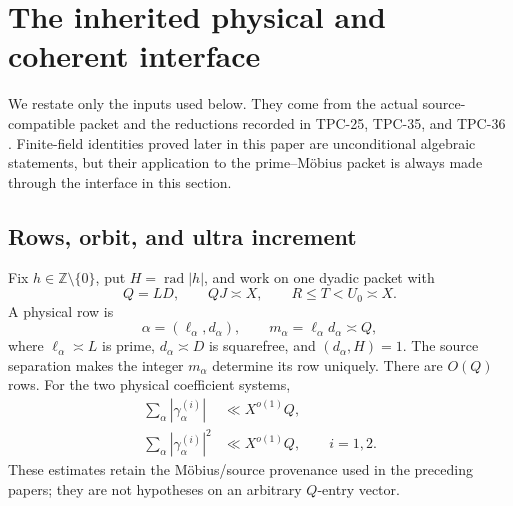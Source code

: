 \section{The inherited physical and coherent interface}
\label{sec:tpc37-inherited-interface}

We restate only the inputs used below.  They come from the actual
source-compatible packet and the reductions recorded in TPC-25,
TPC-35, and TPC-36 \citep{WangTPC25,WangTPC35,WangTPC36}.  Finite-field
identities proved later in this paper are unconditional algebraic
statements, but their application to the prime--M\"obius packet is always
made through the interface in this section.

\subsection{Rows, orbit, and ultra increment}

Fix $h\in\mathbb Z\setminus\{0\}$, put $H=\operatorname{rad}|h|$,
and work on one dyadic packet with
\begin{equation}
 Q=LD,\qquad QJ\asymp X,\qquad R\le T<U_0\asymp X.
 \label{eq:tpc37-interface-scales}
\end{equation}
A physical row is
\begin{equation}
 \alpha=(\ell_\alpha,d_\alpha),\qquad
 m_\alpha=\ell_\alpha d_\alpha\asymp Q,
 \label{eq:tpc37-interface-row}
\end{equation}
where $\ell_\alpha\asymp L$ is prime,
$d_\alpha\asymp D$ is squarefree, and
$(d_\alpha,H)=1$.  The source separation makes the integer $m_\alpha$
determine its row uniquely.  There are $O(Q)$ rows.  For the two
physical coefficient systems,
\begin{align}
 \sum_\alpha|\gamma_\alpha^{(i)}|
 &\ll X^{o(1)}Q,
 \label{eq:tpc37-interface-row-l1}\\
 \sum_\alpha|\gamma_\alpha^{(i)}|^2
 &\ll X^{o(1)}Q,
 \qquad i=1,2.
 \label{eq:tpc37-interface-row-l2}
\end{align}
These estimates retain the M\"obius/source provenance used in the
preceding papers; they are not hypotheses on an arbitrary $Q$-entry
vector.

